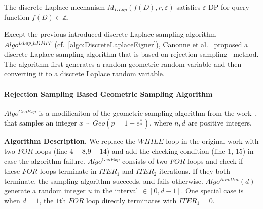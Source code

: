\begin{theorem}
    The discrete Laplace mechanism $M_{DLap}\left(f\left(D\right),r,\varepsilon\right)$ satisfies $\varepsilon$-DP for query function $f\left(D\right)\in\mathbb{Z} $.
\end{theorem}

Except the previous introduced discrete Laplace sampling algorithm $Algo^{DLap\_EKMPP}$ (cf.~\autoref{algo:DiscreteLaplaceEigner}), Canonne et al.~\cite{canonne2020discrete} proposed a discrete Laplace sampling algorithm that is based on rejection sampling~\cite{casella2004generalized} method. The algorithm first generates a random geometric random variable and then converting it to a discrete Laplace random variable.






\paragraph{Rejection Sampling Based Geometric Sampling Algorithm}
\label{para:RejectionSamplingBasedGeometricSamplingAlgorithm}

$Algo^{GeoExp}$ is a modificaiton of the geometric sampling algorithm from the work~\cite{canonne2020discrete}, that samples an integer $x\sim Geo\left( p=1-e^{\frac{n}{d}}\right)$, where $n,d$ are positive integers.

\textbf{Algorithm Description. }
We replace the $WHILE$ loop in the original work with two $FOR$ loops (line $4-8$,$9-14$) and add the checking condition (line $1$, $15$) in case the algorithm failure.
$Algo^{GeoExp}$ consists of two $FOR$ loops and check if these $FOR$ loops terminate in $ITER_1$ and $ITER_2$ iterations. If they both terminate, the sampling algorithm succeeds, and fails otherwise.
$Algo^{RandInt}\left(d\right) $ generate a random integer $u$ in the interval $\in \left[0,d-1\right] $.
One special case is when $d=1$, the $1$th $FOR$ loop directly terminates with $ITER_1=0$.

